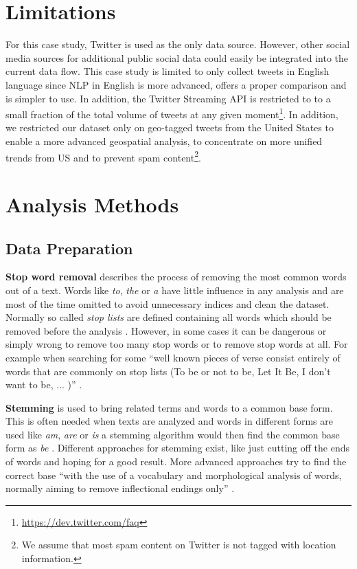 \section{Limitations}
\label{sec:setup}
For this case study, Twitter is used as the only data source. However, other social media sources for additional public social data could easily be integrated into the current data flow. This case study is limited to only collect tweets in English language since NLP in English is more advanced, offers a proper comparison and is simpler to use. In addition, the Twitter Streaming API is restricted to to a small fraction of the total volume of tweets at any given moment\footnote{\url{https://dev.twitter.com/faq} \accessednote}. In addition, we restricted our dataset only on geo-tagged tweets from the United States to enable a more advanced geospatial analysis, to concentrate on more unified trends from US and to prevent spam content\footnote{We assume that most spam content on Twitter is not tagged with location information.}.

\section{Analysis Methods}
\label{sec:analysis-methods}

\subsection{Data Preparation}
\label{subsec:data-preparation}

\textbf{Stop word removal} describes the process of removing the most common words out of a text. Words like \textit{to}, \textit{the} or \textit{a} have little influence in any analysis and are most of the time omitted to avoid unnecessary indices and clean the dataset. Normally so called \textit{stop lists} are defined containing all words which should be removed before the analysis \cite[27]{manning2008introduction}. However, in some cases it can be dangerous or simply wrong to remove too many stop words or to remove stop words at all. For example when searching for some \enquote{well known pieces of verse consist entirely of words that are commonly on stop lists (To be or not to be, Let It Be, I don’t want to be, ... )} \cite[27]{manning2008introduction}.

\textbf{Stemming} is used to bring related terms and words to a common base form. This is often needed when texts are analyzed and words in different forms are used like \textit{am}, \textit{are} or \textit{is} a stemming algorithm would then find the common base form as \textit{be} \cite[32]{manning2008introduction}. Different approaches for stemming exist, like just cutting off the ends of words and hoping for a good result. More advanced approaches try to find the correct base \enquote{with the use of a vocabulary and morphological analysis of words, normally aiming to remove inflectional endings only} \cite[32]{manning2008introduction}.

